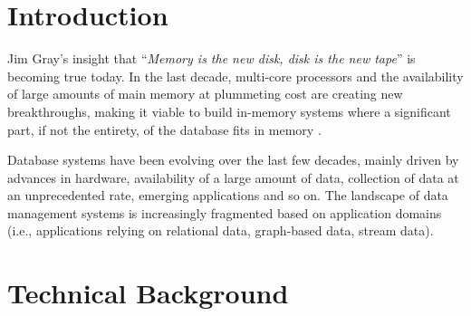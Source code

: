 \documentclass[twocolumn]{article}
\newcommand*\DNA{\textsc{dna}}
\newcommand*\Let[2]{\State #1 $\gets$ #2}
\begin{document}
\section{Introduction}
Jim Gray's insight that ``\textit{Memory is the new disk, disk is the new tape}'' is becoming true today. 
In the last decade, multi-core processors and the availability of large amounts of main memory at
plummeting cost are creating new breakthroughs, making it viable to
build in-memory systems where a significant part, if not the entirety,
of the database fits in memory \cite{Hao:2015}.

Database systems have been evolving over the last few decades, mainly
driven by advances in hardware, availability of a large amount of data,
collection of data at an unprecedented rate, emerging applications and
so on. The landscape of data management systems is increasingly
fragmented based on application domains (i.e., applications relying on
relational data, graph-based data, stream data).

\section{Technical Background}



\end{document}

